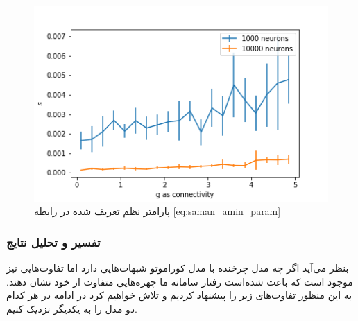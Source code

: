 \documentclass[12pt,onecolumn,a4paper]{article}
\begin{document}
\begin{figure}
\centering
  \includegraphics[width = 10 cm]{../scripts/rotational_model/two_pops_sync_param.png}
 \caption{پارامتر نظم تعریف شده در رابطه \ref{eq:saman_amin_param} }
  \label{fig:two_pops_sync_rotational}
\end{figure}

\subsubsection{تفسیر و تحلیل نتایج}
بنظر می‌آید اگر چه مدل چرخنده با مدل کوراموتو شبهات‌هایی دارد اما تفاوت‌هایی نیز موجود است که باعث شده‌است رفتار سامانه ما چهره‌هایی متفاوت از خود نشان دهند. به این منظور تفاوت‌های زیر را پیشنهاد کردیم و تلاش خواهیم کرد در ادامه در هر کدام دو مدل را به یکدیگر نزدیک کنیم.
\newpage


\end{document}
